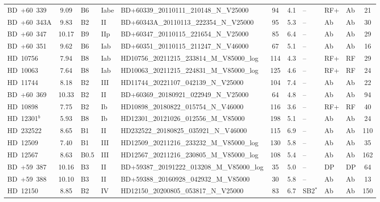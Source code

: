 {\begin{landscape}
\begin{longtable}{lclllcclllc}
\noalign{\smallskip}
BD~+60~339 & 9.09 & B6 & Iabe & BD+60339\_20110111\_210148\_N\_V25000 & 94 & 4.1 & -- & RF+ & Ab & 21 \\
\noalign{\smallskip}
BD~+60~343A & 9.83 & B2 & II & BD+60343A\_20110113\_222354\_N\_V25000 & 95 & 5.3 & -- & Ab & Ab & 30 \\
\noalign{\smallskip}
BD~+60~347 & 10.17 & B9 & IIp & BD+60347\_20110115\_221654\_N\_V25000 & 85 & 6.4 & -- & Ab & Ab & 29 \\
\noalign{\smallskip}
BD~+60~351 & 9.62 & B6 & Iab & BD+60351\_20110115\_211247\_N\_V46000 & 67 & 5.1 & -- & Ab & Ab & 16 \\
\noalign{\smallskip}
HD~10756 & 7.94 & B8 & Iab & HD10756\_20211215\_233814\_M\_V85000\_log & 114 & 4.3 & -- & RF+ & RF & 29 \\
\noalign{\smallskip}
HD~10063 & 7.64 & B8 & Iab & HD10063\_20211215\_224831\_M\_V85000\_log & 125 & 4.6 & -- & RF+ & RF & 24 \\
\noalign{\smallskip}
HD~11744 & 8.18 & B2 & III & HD11744\_20221107\_042139\_N\_V25000 & 104 & 7.4 & -- & Ab & Ab & 22 \\
\noalign{\smallskip}
BD~+60~369 & 10.33 & B2 & II & BD+60369\_20180921\_022949\_N\_V25000 & 64 & 4.8 & -- & Ab & Ab & 94 \\
\noalign{\smallskip}
HD~10898 & 7.75 & B2 & Ib & HD10898\_20180822\_015754\_N\_V46000 & 116 & 3.6 & -- & RF+ & RF & 40 \\
\noalign{\smallskip}
HD~12301$^{b}$ & 5.93 & B8 & Ib & HD12301\_20121026\_012556\_M\_V85000 & 198 & 5.1 & -- & Ab & Ab & 24 \\
\noalign{\smallskip}
HD~232522 & 8.65 & B1 & II & HD232522\_20180825\_035921\_N\_V46000 & 115 & 6.9 & -- & Ab & Ab & 110 \\
\noalign{\smallskip}
HD~12509 & 7.40 & B1 & III & HD12509\_20211216\_233232\_M\_V85000\_log & 130 & 5.8 & -- & Ab & Ab & 35 \\
\noalign{\smallskip}
HD~12567 & 8.63 & B0.5 & III & HD12567\_20211216\_230805\_M\_V85000\_log & 108 & 5.4 & -- & Ab & Ab & 162 \\
\noalign{\smallskip}
BD~+59~387 & 10.16 & B3 & II & BD+59387\_20191222\_013208\_M\_V85000\_log & 35 & 5.0 & -- & DP & DP & 64 \\
\noalign{\smallskip}
BD~+59~388 & 10.10 & B3 & II & BD+59388\_20160928\_042932\_M\_V85000 & 30 & 5.8 & -- & Ab & Ab & 13 \\
\noalign{\smallskip}
HD~12150 & 8.85 & B2 & IV & HD12150\_20200805\_053817\_N\_V25000 & 83 & 6.7 & SB2$^{*}$ & Ab & Ab & 150 \\

\end{longtable}
\end{landscape}}
